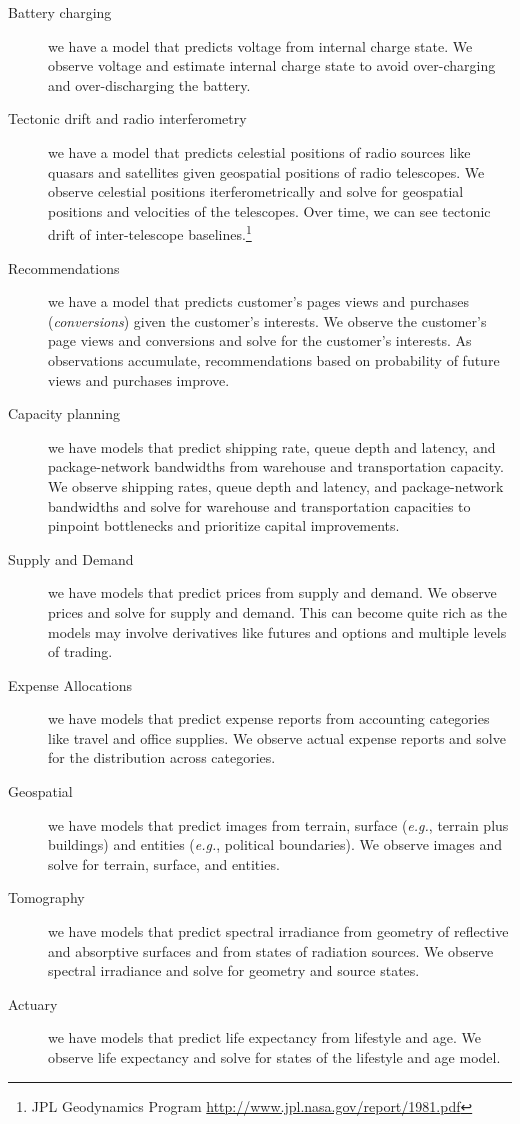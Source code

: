 \documentclass[10pt,oneside,x11names]{article}
\begin{document}
\begin{description}
\item[{Battery charging}] we have a model that predicts voltage from internal charge
state. We observe voltage and estimate internal charge state to avoid
over-charging and over-discharging the battery.
\item[{Tectonic drift and radio interferometry}] we have a model that predicts
celestial positions of radio sources like quasars and satellites given
geospatial positions of radio telescopes. We observe celestial positions
iterferometrically and solve for geospatial positions and velocities of the
telescopes. Over time, we can see tectonic drift of inter-telescope
baselines.\footnote{JPL Geodynamics Program \url{http://www.jpl.nasa.gov/report/1981.pdf}}
\item[{Recommendations}] we have a model that predicts customer's pages views and
purchases (\emph{conversions}) given the customer's interests. We observe the
customer's page views and conversions and solve for the customer's
interests. As observations accumulate, recommendations based on probability
of future views and purchases improve.
\item[{Capacity planning}] we have models that predict shipping rate, queue depth
and latency, and package-network bandwidths from warehouse and
transportation capacity. We observe shipping rates, queue depth and
latency, and package-network bandwidths and solve for warehouse and
transportation capacities to pinpoint bottlenecks and prioritize
capital improvements.
\item[{Supply and Demand}] we have models that predict prices from supply and
demand. We observe prices and solve for supply and demand. This can become
quite rich as the models may involve derivatives like futures and options
and multiple levels of trading.
\item[{Expense Allocations}] we have models that predict expense reports from
accounting categories like travel and office supplies. We observe actual
expense reports and solve for the distribution across categories.
\item[{Geospatial}] we have models that predict images from terrain, surface (\emph{e.g.},
terrain plus buildings) and entities (\emph{e.g.}, political boundaries). We
observe images and solve for terrain, surface, and entities.
\item[{Tomography}] we have models that predict spectral irradiance
from geometry of reflective and absorptive surfaces and from
states of radiation sources. We observe spectral irradiance and solve for
geometry and source states.
\item[{Actuary}] we have models that predict life expectancy from lifestyle and age.
We observe life expectancy and solve for states of the
lifestyle and age model.
\end{description}
\end{document}
